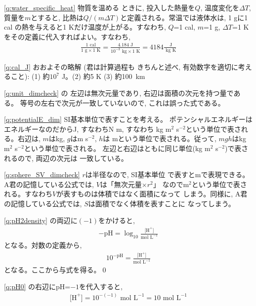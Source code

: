 \ref{q:water_specific_heat} 物質を温める
ときに, 投入した熱量を$Q$, 温度変化を$\Delta T$, 質量を$m$とすると, 
比熱は$Q/(m\Delta T)$と定義される。常温では液体水は, 1 gに1 cal
の熱を与えると1 Kだけ温度が上がる。すなわち, $Q$=1 cal, $m$=1 g, 
$\Delta T$=1 Kをその定義に代入すればよい。すなわち,
\begin{eqnarray*}
\frac{1\text{ cal}}{1\text{ g}\times 1\text{ K}}
=\frac{4.184\text{ J}}{10^{-3}\text{ kg}\times 1\text{ K}}
=4184\frac{\text{ J}}{\text{ kg}\text{ K}}
\end{eqnarray*}
\mv


\ref{q:cal_J} おおよその略解 (君は計算過程も
きちんと述べ, 有効数字を適切に考えること):  
(1) 約$10^7$ J。(2) 約5 K (3) 約100~km\mv

\ref{q:unit_dimcheck} の
左辺は無次元量であり, 右辺は面積の次元を持つ量である。
等号の左右で次元が一致していないので, これは誤った式である。\mv

\ref{q:potentialE_dim} SI基本単位で表すことを考える。
ポテンシャルエネルギーはエネルギーなのだからJ, すなわちN m, すなわち
kg m$^2$ s$^{-2}$という単位で表される。右辺は, $m$はkg, $g$はm s$^{-2}$, $h$は
mという単位で表される。従って, $mgh$はkg m$^2$ s$^{-2}$という単位で表される。
左辺と右辺はともに同じ単位(kg m$^2$ s$^{-2}$)で表されるので, 両辺の次元は
一致している。\mv

\ref{q:sphere_SV_dimcheck} $r$は半径なので, SI基本単位
で表すとmで表現できる。A君の記憶している公式では, $V$は「無次元量×$r^2$」
なのでm$^2$という単位で表される。すなわち$V$が表すものは体積ではなく面積になって
しまう。同様に, A君の記憶している公式では, $S$は面積でなく体積を表すことに
なってしまう。\mv

\ref{q:pH2density}
の両辺に$(-1)$をかけると, 
\begin{eqnarray}
-\text{pH}=\log_{10}\frac{\text{[H}^+\text{]}}{\text{mol~L}^{-1}}
\end{eqnarray}
となる。対数の定義から, 
\begin{eqnarray*}
10^{-\text{pH}}=\frac{\text{[H}^+\text{]}}{\text{mol~L}^{-1}}
\end{eqnarray*}
となる。ここから与式を得る。\qed

\ref{q:pH0} の右辺にpH=$-1$を代入すると, 
\begin{eqnarray*}
\text{[H}^+\text{]}=10^{-(-1)}\text{ mol~L}^{-1}=10\text{ mol~L}^{-1}
\end{eqnarray*}

